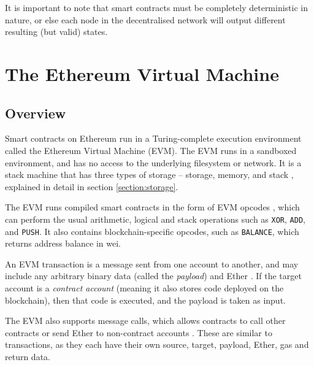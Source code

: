 It is important to note that smart contracts must be completely deterministic in nature, 
or else each node in the decentralised network will output different resulting (but valid) states.

\section{The Ethereum Virtual Machine}

\subsection{Overview}

Smart contracts on Ethereum run in a Turing-complete execution environment called the
Ethereum Virtual Machine (EVM). The EVM runs in a sandboxed environment, and has no access
to the underlying filesystem or network. It is a stack machine that has three types of
storage -- storage, memory, and stack \cite{ethevm}, explained in detail in section \ref{section:storage}.

The EVM runs compiled smart contracts in the form of EVM opcodes \cite{solidityevm}, which can perform
the usual arithmetic, logical and stack operations such as \texttt{XOR}, \texttt{ADD}, and 
\texttt{PUSH}. It also contains blockchain-specific opcodes, such as \texttt{BALANCE}, 
which returns address balance in wei.

An EVM transaction is a message sent from one account to another, and may include any
arbitrary binary data (called the \textit{payload}) and Ether \cite{solidityevm}. If the
target account is a \textit{contract account} (meaning it also stores code deployed on
the blockchain), then that code is executed, and the payload is taken as input.

The EVM also supports message calls, which allows contracts to call other contracts or
send Ether to non-contract accounts \cite{solidityevm}. These are similar to transactions, 
as they each have their own source, target, payload, Ether, gas and return data.


